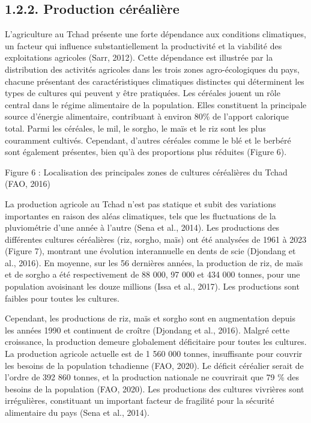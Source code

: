 \documentclass[12pt,oneside]{report}
\begin{document}
\subsection{1.2.2. Production céréalière}
L'agriculture au Tchad présente une forte dépendance aux conditions climatiques, un facteur qui influence substantiellement la productivité et la viabilité des exploitations agricoles (Sarr, 2012). Cette dépendance est illustrée par la distribution des activités agricoles dans les trois zones agro-écologiques du pays, chacune présentant des caractéristiques climatiques distinctes qui déterminent les types de cultures qui peuvent y être pratiquées. Les céréales jouent un rôle central dans le régime alimentaire de la population. Elles constituent la principale source d'énergie alimentaire, contribuant à environ 80\% de l'apport calorique total. Parmi les céréales, le mil, le sorgho, le maïs et le riz sont les plus couramment cultivés. Cependant, d'autres céréales comme le blé et le berbéré sont également présentes, bien qu'à des proportions plus réduites (Figure 6).

Figure 6 : Localisation des principales zones de cultures céréalières du Tchad (FAO, 2016)

La production agricole au Tchad n'est pas statique et subit des variations importantes en raison des aléas climatiques, tels que les fluctuations de la pluviométrie d'une année à l'autre (Sena et al., 2014). Les productions des différentes cultures céréalières (riz, sorgho, maïs) ont été analysées de 1961 à 2023 (Figure 7), montrant une évolution interannuelle en dents de scie (Djondang et al., 2016). En moyenne, sur les 56 dernières années, la production de riz, de maïs et de sorgho a été respectivement de 88 000, 97 000 et 434 000 tonnes, pour une population avoisinant les douze millions (Issa et al., 2017). Les productions sont faibles pour toutes les cultures.

Cependant, les productions de riz, maïs et sorgho sont en augmentation depuis les années 1990 et continuent de croître (Djondang et al., 2016). Malgré cette croissance, la production demeure globalement déficitaire pour toutes les cultures. La production agricole actuelle est de 1 560 000 tonnes, insuffisante pour couvrir les besoins de la population tchadienne (FAO, 2020). Le déficit céréalier serait de l'ordre de 392 860 tonnes, et la production nationale ne couvrirait que 79 \% des besoins de la population (FAO, 2020). Les productions des cultures vivrières sont irrégulières, constituant un important facteur de fragilité pour la sécurité alimentaire du pays (Sena et al., 2014).
\end{document}
